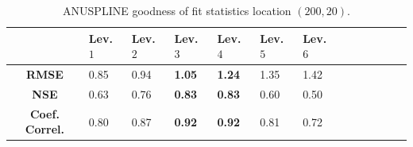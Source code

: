 \documentclass[10pt,letterpaper,conference]{ieeeconf}
\begin{document}
\begin{table}[ht] 
\caption{ANUSPLINE goodness of fit statistics location $(200,20)$.}
\vspace*{-0.15in}
\label{table:ANUSP_goddness_200_20}
\vskip4mm
\centering
\begin{tabularx}{\columnwidth}{@{}>{\bfseries}c*{12}{X}@{}}
\hline \hline
 & Lev. $1$ & Lev. $2$ & Lev. $3$ & Lev. $4$ & Lev. $5$ & Lev. 
$6$ \\
\hline \hline
RMSE & 0.85&0.94& {\bf 1.05}& {\bf 1.24}&1.35&1.42 \\
\hline
NSE & 0.63&0.76& {\bf 0.83}& {\bf 0.83}&0.60&0.50 \\
\hline
Coef. Correl. & 0.80&0.87&{\bf 0.92}& {\bf 0.92}&0.81&0.72 \\
\hline
\end{tabularx}
\end{table}
\end{document}
